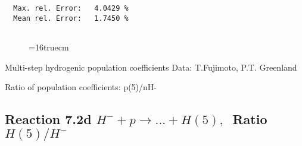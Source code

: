 \documentclass[12pt]{article}
\begin{document}
\begin{small}
\begin{verbatim}
  Max. rel. Error:   4.0429 %
  Mean rel. Error:   1.7450 %


\end{verbatim}\end{small}
\begin{figure} \label{7.2c}
\epsfxsize=16truecm
\end{figure}
\newpage

 Multi-step hydrogenic population coefficients
 Data: T.Fujimoto, P.T. Greenland

 Ratio of population coefficients: p(5)/nH-

\subsection{
Reaction 7.2d $ H^- + p \rightarrow ...+ H(5) , \  $
Ratio $H(5)/H^- $
}
\end{document}
